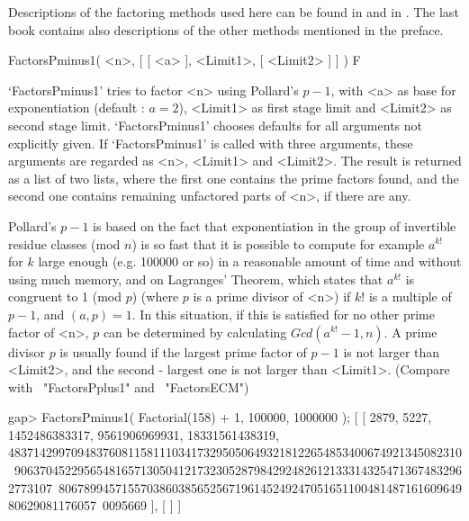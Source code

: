 

Descriptions of the factoring methods used here can be found in
\cite{FactorizationAndPrimalityTesting} and in
\cite{ComputationalAlgebraicNumberTheory}.
The last book contains also descriptions of the other methods mentioned
in the preface.

 
\>FactorsPminus1( <n>, [ [ <a> ], <Limit1>, [ <Limit2> ] ] ) F

`FactorsPminus1' tries to factor <n> using Pollard's $p-1$, with <a>
as base for exponentiation (default : $a=2$), 
<Limit1> as first stage limit and <Limit2> as second stage limit.
`FactorsPminus1' chooses defaults for all arguments not explicitly given.
If `FactorsPminus1' is called with three arguments, these arguments
are regarded as <n>, <Limit1> and <Limit2>.
The result is returned as a list of two lists, where the first one 
contains the prime factors found, and the second one contains
remaining unfactored parts of <n>, if there are any.

Pollard's $p-1$ is based on the fact that exponentiation in the
group of invertible residue classes (mod $n$) is so fast that
it is possible to compute for example $a^{k!}$ for $k$ large enough
(e.g. 100000 or so) in a reasonable amount of time and without
using much memory, and on 
Lagranges' Theorem,
which states that $a^{k!}$ is congruent to 1 (mod $p$) 
(where $p$ is a prime divisor of <n>) if $k!$ is a multiple of $p-1$,
and $(a,p)=1$.
In this situation, if this is satisfied for no other
prime factor of <n>, $p$ can be determined by 
calculating $Gcd(a^{k!}-1,n)$.
A prime divisor $p$ is usually found if the largest prime factor
of $p-1$ is not larger than <Limit2>, and the second - largest one
is not larger than <Limit1>.
(Compare with ~"FactorsPplus1" and ~"FactorsECM")

\beginexample
gap> FactorsPminus1( Factorial(158) + 1, 100000, 1000000 );
[ [ 2879, 5227, 1452486383317, 9561906969931, 18331561438319, 
      483714299709483760811581110341732950506493218122654853400674921345082310\
906370452295654816571305041217323052879842924826121333143254713674832962773107\
806789945715570386038565256719614524924705165110048148716160964980629081176057\
0095669 ], [  ] ]

